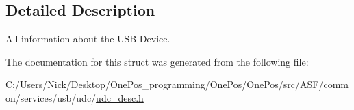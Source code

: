 \subsection{Detailed Description}
All information about the U\-S\-B Device. 

The documentation for this struct was generated from the following file\-:\begin{DoxyCompactItemize}
\item 
C\-:/\-Users/\-Nick/\-Desktop/\-One\-Pos\-\_\-programming/\-One\-Pos/\-One\-Pos/src/\-A\-S\-F/common/services/usb/udc/\hyperlink{udc__desc_8h}{udc\-\_\-desc.\-h}\end{DoxyCompactItemize}
